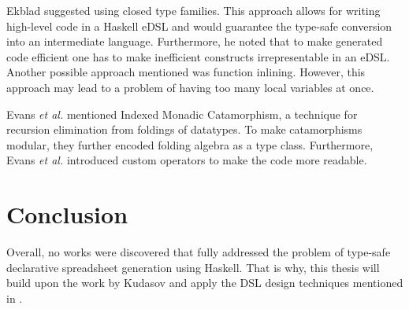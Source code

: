 Ekblad \cite{ekblad_high-performance_2016} suggested using closed type families. This approach allows for writing high-level code in a Haskell eDSL and would guarantee the type-safe conversion into an intermediate language. Furthermore, he noted that to make generated code efficient one has to make inefficient constructs irrepresentable in an eDSL. Another possible approach mentioned \cite{ekblad_high-performance_2016} was function inlining. However, this approach may lead to a problem of having too many local variables at once.

Evans \textit{et al.} \cite{evans_circuitflow_2021} mentioned Indexed Monadic Catamorphism, a technique for recursion elimination from foldings of datatypes. To make catamorphisms modular, they further encoded folding algebra as a type class. Furthermore, Evans \textit{et al.} introduced custom operators to make the code more readable.

\section{Conclusion}

Overall, no works were discovered that fully addressed the problem of type-safe declarative spreadsheet generation using Haskell. That is why, this thesis will build upon the work by Kudasov \cite{youtube_kudasov} and apply the DSL design techniques mentioned in .